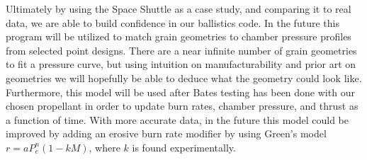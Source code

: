 Ultimately by using the Space Shuttle as a case study, and comparing it to real data, we are able to build confidence in our ballistics code. In the future this program will be utilized to match grain geometries to chamber pressure profiles from selected point designs. There are a near infinite number of grain geometries to fit a pressure curve, but using intuition on manufacturability and prior art on geometries we will hopefully be able to deduce what the geometry could look like. Furthermore, this model will be used after Bates testing has been done with our chosen propellant in order to update burn rates, chamber pressure, and thrust as a function of time. With more accurate data, in the future this model could be improved by adding an erosive burn rate modifier by using Green’s model \(r = a P_c^n (1 - k M)\), where \(k\) is found experimentally.